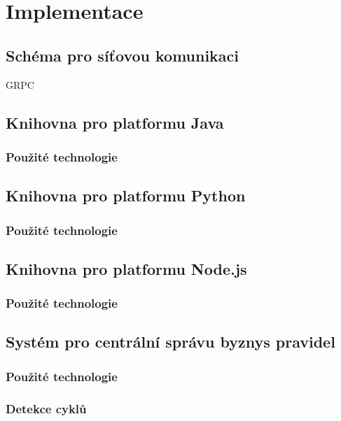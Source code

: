 
\chapter{Implementace}\label{ch:implementace}

\section{Schéma pro síťovou komunikaci}

GRPC

\section{Knihovna pro platformu Java}

\subsection{Použité technologie}

\subsection{}

\section{Knihovna pro platformu Python}


\subsection{Použité technologie}

\subsection{}

\section{Knihovna pro platformu Node.js}


\subsection{Použité technologie}

\subsection{}

\section{Systém pro centrální správu byznys pravidel}

\subsection{Použité technologie}

\subsection{Detekce cyklů}
